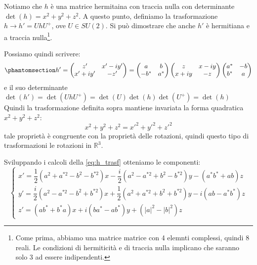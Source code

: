 Notiamo che $h$ è una matrice hermitaina con traccia nulla con determinante $\det (h)=x^2+y^2+z^2$.
A questo punto, definiamo la trasformazione $h\xrightarrow{}h'=UhU^+$, ove $U\in SU(2)$. Si può dimostrare che anche $h'$ è hermitiana e a traccia nulla\footnote{Come prima, abbiamo una matrice matrice con 4 elemnti complessi, quindi 8 reali. Le condizioni di hermiticità e di traccia nulla implicano che saranno solo 3 ad essere indipendenti.}.

Possiamo quindi scrivere:
\begin{equation}\phantomsection\label{eq:h_trasf}
   h'=\begin{pmatrix}
 z' &x'-iy'\\
x'+iy'&-z'\\
\end{pmatrix}=
\begin{pmatrix}
 a&b \\
-b^* &a^*\\
\end{pmatrix} 
\begin{pmatrix}
 z &x-iy\\
x+iy&-z\\
\end{pmatrix}
\begin{pmatrix}
 a^*&-b \\
b^* &a\\
\end{pmatrix} 
\end{equation}
e il suo determinante $\det(h')=\det(UhU^+)=\det(U)\det(h)\det(U^+)=\det(h)$
Quindi la trasformazione definita sopra mantiene invariata la forma quadratica $x^2+y^2+z^2$:
\begin{equation}
    x^2+y^2+z^2=x'^2+y'^2+z'^2
\end{equation}
tale proprietà è congruente con la proprietà delle rotazioni, quindi questo tipo di trasformazioni  le rotazioni in $\mathds{R}^3$.

Sviluppando i calcoli della \eqref{eq:h_trasf} otteniamo le componenti:
\begin{equation}
    \begin{cases}
        x'=\dfrac{1}{2}(a^2+a^{*2}-b^2-b^{*2})x-\dfrac{i}{2}(a^2-a^{*2}+b^2-b^{*2})y-(a^*b^*+ab)z\\
        y'=\dfrac{i}{2}(a^2-a^{*2}-b^2+b^{*2})x+\dfrac{1}{2}(a^2+a^{*2}+b^2+b^{*2})y-i(ab-a^*b^*)z\\
        z'=(ab^*+b^*a)x+i(ba^*-ab^*)y+(|a|^2-|b|^2)z
    \end{cases}
\end{equation}

